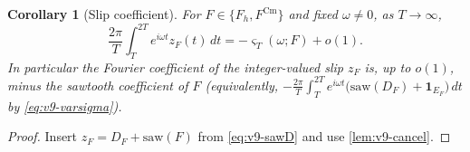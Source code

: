 \documentclass[11pt,a4paper]{article}
\numberwithin{equation}{section}
\newtheorem{corollary}[theorem]{Corollary}
\theoremstyle{definition}
\theoremstyle{remark}
\newcommand{\ind}{\mathbf 1}
\newcommand{\Cm}{\mathrm{Cm}}
\begin{document}
\begin{corollary}[Slip coefficient]\label{cor:v9-slip}
For $F\in\{F_h,F^{\Cm}\}$ and fixed $\omega\ne0$, as $T\to\infty$,
\begin{equation}\label{eq:v9-slipcoeff}
\frac{2\pi}{T}\int_T^{2T}e^{i\omega t}z_F(t)\,dt=-\varsigma_T(\omega;F)+o(1).
\end{equation}
In particular the Fourier coefficient of the integer-valued slip $z_F$ is, up to $o(1)$, minus the sawtooth coefficient of $F$ (equivalently, $-\frac{2\pi}T\int_T^{2T}e^{i\omega t}\bigl(\mathrm{saw}(D_F)+\ind_{E_F}\bigr)\,dt$ by \eqref{eq:v9-varsigma}).
\end{corollary}
\begin{proof}
Insert $z_F=D_F+\mathrm{saw}(F)$ from \eqref{eq:v9-sawD} and use \cref{lem:v9-cancel}.
\end{proof}
\end{document}
